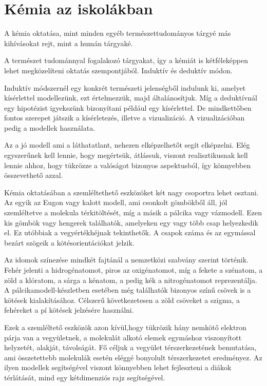 \documentclass[colorlinks]{thesis-ekf}
\theoremstyle{definition}
\theoremstyle{remark}
\begin{document}
\chapter{Kémia az iskolákban}
A kémia oktatása, mint minden egyéb természettudományos tárgyé más kihívásokat rejt, mint a humán tárgyaké. 

A természet tudománnyal fogalakozó tárgyakat, így a kémiát is kétféleképpen lehet megközelíteni oktatás szempontjából. Induktív és deduktív módon. 

Induktív módszernél egy konkrét természeti jelenségből indulunk ki,
amelyet kísérlettel modellezünk, ezt értelmezzük, majd általánosítjuk. Míg a deduktívnál egy hipotézist igyekszünk bizonyítani például egy kísérlettel. De mindkettőben  fontos szerepet játszik a kísérletezés, illetve a vizualizáció. A vizualizációban pedig a modellek használata. \cite{kémia_modertan}

Az a jó modell ami a láthatatlant, nehezen elképzelhetőt segít elképzelni. Elég egyszerűnek kell lennie, hogy megértsük, átlássuk, viszont realisztikusnak kell lennie ahhoz, hogy tükrözze a valóságot bizonyos aspektusból, így könnyebben összevethető azzal. \cite{kémia_modertan}

Kémia oktatásában a szemléltethető eszközöket két nagy csoportra lehet osztani. Az egyik az Eugon vagy kalott modell, ami csonkolt gömbökből áll, jól szemléltetve a molekula térkitöltését, míg a másik a pálcika vagy vázmodell. Ezen kis gömbök vagy hengerek találhatók, amelyeken egy vagy több csap helyezkedik el. Ez utóbbiak a vegyértékhéjnak tekinthetők. A csapok száma és az egymással bezárt szögeik a kötésorientációkat jelzik. \cite{kémia_modertan}

Az idomok színezése mindkét fajtánál a nemzetközi szabvány szerint történik. Fehér jelenti a hidrogénatomot, piros az oxigénatomot, míg a fekete a szénatom, a zöld a klóratom, a sárga a kénatom, a pedig kék a nitrogénatomot reprezentálja. A pálcikamodell-készletben esetében még találhatók bizonyos színű csövek is a kötések kialakításához. Célszerű következetesen a zöld csöveket a szigma, a fehéreket a pí kötések jelzésére használni. \cite{kémia_modertan}

Ezek a szemléltető eszközök azon kívül,hogy tükrözik hány nemkötő elektron párja van a vegyületnek, a molekulát alkotó elemek egymáshoz viszonyított helyzetét, alakját, távolságát. Fő céljuk a vegyület térszerkezetének bemutatása, ami összetettebb molekulák esetén eléggé bonyolult térszerkezetet eredményez. Az ilyen modellek segítségével viszont könnyebben lehet fejleszteni a diákok térlátását, mind egy kétdimenziós rajz segítségével.\cite{kémia_modertan}
\end{document}
